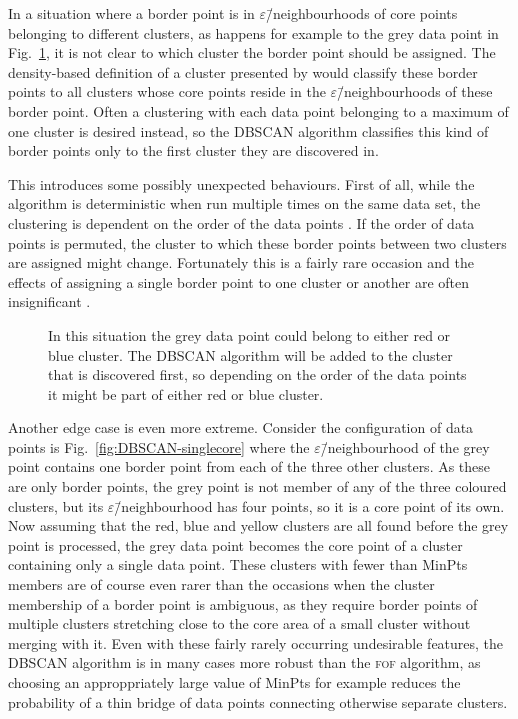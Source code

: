 \documentclass[english, oneside]{HYgradu}
\begin{document}
In a situation where a border point is in $\varepsilon$\=/neighbourhoods of core points belonging to different clusters, as happens for example to the grey data point in Fig.\ \ref{fig:DBSCAN-ambiquity}, it is not clear to which cluster the border point should be assigned. The density-based definition of a cluster presented by \citet{ester1996density} would classify these border points to all clusters whose core points reside in the $\varepsilon$\=/neighbourhoods of these border point. Often a clustering with each data point belonging to a maximum of one cluster is desired instead, so the DBSCAN algorithm classifies this kind of border points only to the first cluster they are discovered in. 

This introduces some possibly unexpected behaviours. First of all, while the algorithm is deterministic when run multiple times on the same data set, the clustering is dependent on the order of the data points \citep{schubert2017dbscan}. If the order of data points is permuted, the cluster to which these border points between two clusters are assigned might change. Fortunately this is a fairly rare occasion and the effects of assigning a single border point to one cluster or another are often insignificant \citep{schubert2017dbscan}.

\begin{figure}
    \centering
    
    \caption{In this situation the grey data point could belong to either red or blue cluster. The DBSCAN algorithm will be added to the cluster that is discovered first, so depending on the order of the data points it might be part of either red or blue cluster.}\label{fig:DBSCAN-ambiquity}
\end{figure}

Another edge case is even more extreme. Consider the configuration of data points is Fig.\ \ref{fig:DBSCAN-singlecore} where the $\varepsilon$\=/neighbourhood of the grey point contains one border point from each of the three other clusters. As these are only border points, the grey point is not member of any of the three coloured clusters, but its $\varepsilon$\=/neighbourhood has four points, so it is a core point of its own. Now assuming that the red, blue and yellow clusters are all found before the grey point is processed, the grey data point becomes the core point of a cluster containing only a single data point. These clusters with fewer than MinPts members are of course even rarer than the occasions when the cluster membership of a border point is ambiguous, as they require border points of multiple clusters stretching close to the core area of a small cluster without merging with it. Even with these fairly rarely occurring undesirable features, the DBSCAN algorithm is in many cases more robust than the \textsc{fof} algorithm, as choosing an approppriately large value of MinPts for example reduces the probability of a thin bridge of data points connecting otherwise separate clusters.
\end{document}
